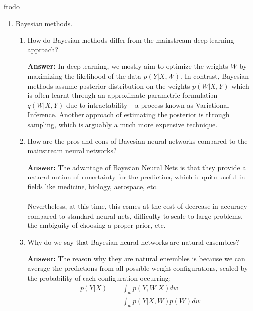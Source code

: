 ƒtodo\documentclass{article}
\newenvironment{QandA}{\begin{enumerate}[label=\arabic*.]}{\end{enumerate}}
\newenvironment{InnerQandA}{\begin{enumerate}[label=\roman*.]}{\end{enumerate}}
\newenvironment{answer}{\par\normalfont \textbf{Answer:}}{}
\newcommand{\g}{\vert}
\begin{document}
\begin{QandA}
    \item Bayesian methods.
    \begin{InnerQandA}
        \item How do Bayesian methods differ from the mainstream deep learning approach?
        \begin{answer}
            In deep learning, we mostly aim to optimize the weights $W$ by maximizing the likelihood of the data $p(Y \g X, W)$. In contrast, Bayesian methods assume posterior distribution on the weights $p(W \g X, Y)$ which is often learnt through an approximate parametric formulation $q(W \g X, Y)$ due to intractability -- a process known as Variational Inference. Another approach of estimating the posterior is through sampling, which is arguably a  much more expensive technique.
        \end{answer}

        \item How are the pros and cons of Bayesian neural networks compared to the mainstream neural networks?
        \begin{answer}
            The advantage of Bayesian Neural Nets is that they provide a natural notion of uncertainty for the prediction, which is quite useful in fields like medicine, biology, aerospace, etc.\\\\
            Nevertheless, at this time, this comes at the cost of decrease in accuracy compared to standard neural nets, difficulty to scale to large problems, the ambiguity of choosing a proper prior, etc.
        \end{answer}

        \item Why do we say that Bayesian neural networks are natural ensembles?
        \begin{answer}
            The reason why they are natural ensembles is because we can average the predictions from all possible weight configurations, scaled by the probability of each configuration occurring:
            \begin{align*}
                p(Y \g X) &= \int_w p(Y, W \g X) dw \\
                &= \int_w p(Y \g X, W) p(W) dw
            \end{align*}
        \end{answer}
    \end{InnerQandA}


\end{QandA}
\end{document}
